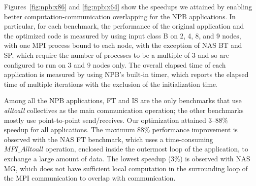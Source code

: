 Figures~\ref{fig:npb:x86} and \ref{fig:npb:x64} show the speedups we
attained by enabling better computation-communication overlapping for
the NPB applications.  In particular, for each benchmark, the
performance of the original application and the optimized code is
measured by using input class B on 2, 4, 8, and 9 nodes, with one MPI
process bound to each node, with the exception of NAS BT and SP, which
require the number of processes to be a multiple of 3 and so are
configured to run on 3 and 9 nodes only.  The overall elapsed time of
each application is measured by using NPB's built-in timer, which
reports the elapsed time of multiple iterations with the exclusion of
the initialization time.

Among all the NPB applications, FT and IS are the only benchmarks that
use {\em alltoall} collectives as the main communication operation;
the other benchmarks mostly use point-to-point send/receives.  Our
optimization attained 3--88\% speedup for all applications.  The
maximum 88\% performance improvement is observed with the NAS FT
benchmark, which uses a time-consuming $MPI\_Alltoall$ operation,
enclosed inside the outermost loop of the application, to exchange a
large amount of data.  The lowest speedup (3\%) is observed with NAS
MG, which does not have sufficient local computation in the
surrounding loop of the MPI communication to overlap with
communication. 
